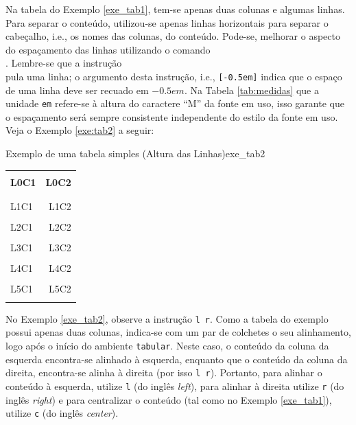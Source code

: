 Na tabela do Exemplo \ref{exe_tab1}, tem-se apenas duas colunas e algumas linhas. Para separar o conteúdo, utilizou-se apenas linhas horizontais para separar o cabeçalho, i.e., os nomes das colunas, do conteúdo. Pode-se, melhorar o aspecto do espaçamento das linhas utilizando o comando \texttt{\\[-0.5em]}. Lembre-se que a instrução \texttt{\\} pula uma linha; o argumento desta instrução, i.e., \texttt{[-0.5em]} indica que o espaço de uma linha deve ser recuado em $-0.5em$. Na Tabela \ref{tab:medidas} que a unidade {\tt em} refere-se à altura do caractere ``M'' da fonte em uso, isso garante que o espaçamento será sempre consistente independente do estilo da fonte em uso. Veja o Exemplo \ref{exe:tab2} a seguir:

\begin{texexptitled}[breakable,center lower,enhanced,middle=2mm]{Exemplo de uma tabela simples (Altura das Linhas)}{exe_tab2}
\begin{tabular}{l r}
\hline 
\\[-0.5em]
\textbf{L0C1} & \textbf{L0C2} \\
\\[-0.5em]
\hline
\\[-0.5em]
L1C1 & L1C2 \\
\\[-0.5em]
L2C1 & L2C2 \\
\\[-0.5em]
L3C1 & L3C2 \\
\\[-0.5em]
L4C1 & L4C2 \\
\\[-0.5em]
L5C1 & L5C2 \\
\\[-0.5em]
\hline
\end{tabular}
\end{texexptitled}

No Exemplo \ref{exe_tab2}, observe a instrução \texttt{{l r}}. Como a tabela do exemplo possui apenas duas colunas, indica-se com um par de colchetes o seu alinhamento, logo após o início do ambiente {\tt tabular}. Neste caso, o conteúdo da coluna da esquerda encontra-se alinhado à esquerda, enquanto que o conteúdo da coluna da direita, encontra-se alinha à direita (por isso {\tt l r}). Portanto, para alinhar o conteúdo à esquerda, utilize {\tt l} (do inglês \textit{left}), para alinhar à direita utilize {\tt r} (do inglês \textit{right}) e para centralizar o conteúdo (tal como no Exemplo \ref{exe_tab1}), utilize {\tt c} (do inglês \textit{center}).

